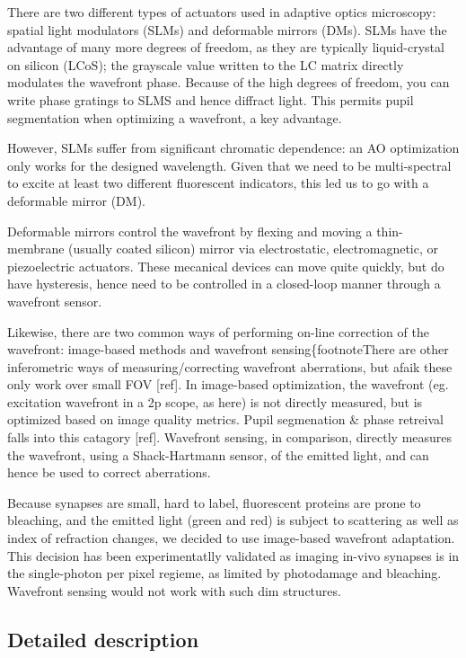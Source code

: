 \documentclass[a4paper,10pt]{article}
\begin{document}
There are two different types of actuators used in adaptive optics microscopy: spatial light modulators (SLMs) and deformable mirrors (DMs).  SLMs have the advantage of many more degrees of freedom, as they are typically liquid-crystal on silicon (LCoS); the grayscale value written to the LC matrix directly modulates the wavefront phase.  Because of the high degrees of freedom, you can write phase gratings to SLMS and hence diffract light.  This permits pupil segmentation when optimizing a wavefront, a key advantage.  

However, SLMs suffer from significant chromatic dependence: an AO optimization only works for the designed wavelength.  Given that we need to be multi-spectral to excite at least two different fluorescent indicators, this led us to go with a deformable mirror (DM). 

Deformable mirrors control the wavefront by flexing and moving a thin-membrane (usually coated silicon) mirror via electrostatic, electromagnetic, or piezoelectric actuators.  These mecanical devices can move quite quickly, but do have hysteresis, hence need to be controlled in a closed-loop manner through a wavefront sensor.  

Likewise, there are two common ways of performing on-line correction of the wavefront: image-based methods and wavefront sensing\{footnote{There are other inferometric ways of measuring/correcting wavefront aberrations, but afaik these only work over small FOV [ref]}.  In image-based optimization, the wavefront (eg. excitation wavefront in a 2p scope, as here) is not directly measured, but is optimized based on image quality metrics.  Pupil segmenation \& phase retreival falls into this catagory [ref].  Wavefront sensing, in comparison, directly measures the wavefront, using a Shack-Hartmann sensor, of the emitted light, and can hence be used to correct aberrations.  

Because synapses are small, hard to label, fluorescent proteins are prone to bleaching, and the emitted light (green and red) is subject to scattering as well as index of refraction changes, we decided to use image-based wavefront adaptation.  This decision has been experimentatlly validated as imaging in-vivo synapses is in the single-photon per pixel regieme, as limited by photodamage and bleaching.  Wavefront sensing would not work with such dim structures.  

\subsection{Detailed description}
\end{document}
